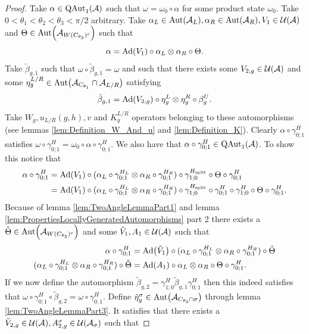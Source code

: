 \documentclass[12pt,a4paper,twoside]{article}
\numberwithin{equation}{section}
\begin{document}
\begin{proof}
	Take $\alpha\in\QAut{\AA}$ such that $\omega=\omega_0\circ\alpha$ for some product state $\omega_0$. Take $0<\theta_1<\theta_2<\theta_3<\pi/2$ arbitrary. Take $\alpha_L\in\Aut{\AA_L},\alpha_R\in\Aut{\AA_R},V_1\in\UU(\AA)$ and $\Theta\in\Aut{\AA_{W(C_{\theta_3})^c}}$ such that
	\begin{equation}
		\alpha=\Ad{V_1}\circ\alpha_L\otimes\alpha_R\circ\Theta.
	\end{equation}
	Take $\tilde{\beta}_{g,1}$ such that $\omega\circ\tilde{\beta}_{g,1}=\omega$ and such that there exists some $V_{2,g}\in\mathcal U(\mathcal A)$ and some $\eta_g^{L/R}\in\Aut{\AA_{C_{\theta_1}}\cap\AA_{L/R}}$ satisfying
	\begin{equation}
		\tilde{\beta}_{g,1}=\Ad{V_{2,g}}\circ\eta_{g}^L\otimes\eta_{g}^R\circ\beta_g^U.
	\end{equation}
	Take $W_g,u_{L/R}(g,h),v$ and $K_g^{L/R}$ operators belonging to these automorphisms (see lemmas \ref{lem:Definition_W_And_u} and \ref{lem:Definition_K}). Clearly $\alpha\circ\gamma^H_{0;1}$ satisfies $\omega\circ\gamma^{H}_{0;1}=\omega_0\circ\alpha\circ\gamma^{H}_{0;1}$. We also have that $\alpha\circ\gamma^{H}_{0;1}\in\QAut{\AA}$. To show this notice that
	\begin{align}
		\alpha\circ\gamma^{H}_{0;1}&=\Ad{V_1}\circ(\alpha_L\circ\gamma^{H_L}_{0;1}\otimes\alpha_R\circ\gamma^{H_R}_{0;1})\circ\gamma^{H_\text{split}}_{1;0}\circ\Theta\circ\gamma^H_{0;1}\\
		&=\Ad{V_1}\circ(\alpha_L\circ\gamma^{H_L}_{0;1}\otimes\alpha_R\circ\gamma^{H_R}_{0;1})\circ\gamma^{H_\text{split}}_{1;0}\circ\gamma^{H}_{0;1}\circ\gamma^{H}_{1;0}\circ\Theta\circ\gamma^H_{0;1}.
	\end{align}
	Because of lemma \ref{lem:TwoAngleLemmaPart1} and lemma \ref{lem:PropertiesLocallyGeneratedAutomorphisms} part 2 there exists a $\tilde{\Theta}\in\Aut{\AA_{W(C_{\theta_2})^c}}$ and some $\tilde V_1,A_1\in\mathcal U(\mathcal A)$ such that
	\begin{align}
		\alpha\circ\gamma^H_{0;1}&=\Ad{\tilde V_1}\circ(\alpha_L\circ\gamma^{H_L}_{0;1}\otimes\alpha_R\circ\gamma^{H_R}_{0;1})\circ\tilde\Theta\\
		\label{eq:ProofThatTheH2IndexIsInvariantUnderLGA's_Definition_A1}
		(\alpha_L\circ\gamma^{H_L}_{0;1}\otimes\alpha_R\circ\gamma^{H_R}_{0;1})\circ\tilde\Theta&=\Ad{A_1}\circ \alpha_L\otimes\alpha_R\circ\Theta\circ\gamma^{H}_{0;1}.
	\end{align}
	If we now define the automorphism $\tilde{\beta}_{g,2}=\gamma^{H}_{1;0}\tilde\beta_{g,1}\gamma^{H}_{0;1}$ then this indeed satisfies that $\omega\circ\gamma^{H}_{0;1}\circ\tilde{\beta}_{g,2}=\omega\circ\gamma^{H}_{0;1}$. Define $\tilde\eta_g^\sigma\in\Aut{\AA_{C_{\theta_2}\cap\sigma}}$ through lemma \ref{lem:TwoAngleLemmaPart3}. It satisfies that there exists a $\tilde V_{2,g}\in\mathcal U(\mathcal A),A_{2,g}^{\sigma}\in\mathcal U(\mathcal A_\sigma)$ such that

\end{proof}
\end{document}
